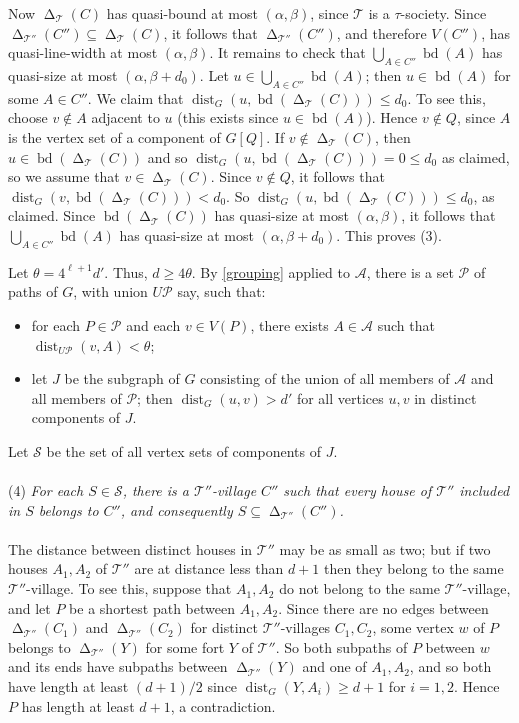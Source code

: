 \documentclass[titlepage,11pt]{article}
\newcommand{\dist}{\operatorname{dist}}
\newcommand{\voro}{\operatorname{\Delta}}
\newcommand{\bd}{\operatorname{bd}}
\newcommand{\mac}{\mathcal}
\begin{document}
	Now 
	$\voro_{\mac T}(C)$ has quasi-bound at most $(\alpha,\beta)$, since $\mac T$ is a $\tau$-society. 
	Since $\voro_{\mac T''}(C'')\subseteq \voro_{\mac T}(C)$, it follows that $\voro_{\mac T''}(C'')$, and therefore $V(C'')$, has quasi-line-width
	at most $(\alpha,\beta)$. It remains to check that $\bigcup_{A\in C''}\bd (A)$ has quasi-size
	at most $(\alpha,\beta+d_0)$. Let $u\in \bigcup_{A\in C''}\bd (A)$; then $u\in \bd(A)$ for some $A\in C''$. We claim that 
	$\dist_G(u,\bd(\voro_{\mac T}(C)))\le  d_0$. 
	To see this, choose
	$v\notin A$ adjacent to $u$ (this exists since $u\in \bd(A)$). Hence $v\notin Q$, since $A$ is the vertex set of a component of $G[Q]$.
	If $v\notin \voro_{\mac T}(C)$, then $u\in \bd(\voro_{\mac T}(C))$ and so $\dist_G(u,\bd(\voro_{\mac T}(C)))=0\le  d_0$ as claimed, so
	we assume that
	$v\in \voro_{\mac T}(C)$. Since $v\notin Q$, it follows that 
	$\dist_G(v,\bd(\voro_{\mac T}(C)))<d_0$. So $\dist_G(u,\bd(\voro_{\mac T}(C)))\le d_0$, as claimed. Since
	$\bd(\voro_{\mac T}(C))$ has quasi-size at most $(\alpha,\beta)$, it follows that  $\bigcup_{A\in C''}\bd (A)$ has quasi-size at most
	$(\alpha,\beta+d_0)$. This proves (3).
	
	\bigskip
	
	Let $\theta= 4^{\ell+1} d'$. Thus, $d\ge4\theta$.
	By \ref{grouping} applied to $\mac A$,
	there is a set $\mac P$ of paths of $G$, with union $U\mac P$ say, such that:
	\begin{itemize}
		\item for each $P\in \mac P$ and each $v\in V(P)$, there exists $A\in \mac A$ such that $\dist_{U\mac P}(v,A)<  \theta$;
		\item let $J$ be the subgraph of $G$ consisting of the union of all members of $\mac A$ and all members of $\mac P$;
		then $\dist_G(u,v)>d'$ for all vertices $u,v$ in distinct components of $J$.
	\end{itemize}
	Let $\mac S$ be the set of all vertex sets of components of $J$. 
	\\
	\\
	(4) {\em For each $S\in \mac S$, there is a $\mac T''$-village $C''$ such that
		every house of $\mac T''$ included in $S$ belongs to $C''$,
		and consequently $S\subseteq \voro_{\mac T''}(C'')$.}
	\\
	\\
	The distance between distinct houses in $\mac T''$ may be as small as two; but if two houses $A_1,A_2$ of $\mac T''$ are at distance 
	less than $d+1$ then they belong to the same $\mac T''$-village. To see this, suppose that $A_1,A_2$ do not belong to the same 
	$\mac T''$-village, and let $P$ be a shortest path between $A_1,A_2$.  Since there are no edges between $\voro_{\mac T''}(C_1)$ and $\voro_{\mac T''}(C_2)$
	for distinct $\mac T''$-villages $C_1,C_2$, some vertex $w$ of $P$ belongs to $\voro_{\mac T''}(Y)$ for some fort $Y$ of $\mac T''$. 
	So both subpaths of $P$ between $w$ and its ends have subpaths between 
	$\voro_{\mac T''}(Y)$ and one of $A_1, A_2$, and so both have length at least $(d+1)/2$ since $\dist_G(Y,A_i)\ge d+1$ for $i = 1,2$. 
	Hence $P$ has length at least $d+1$, a contradiction.
	
\end{document}
